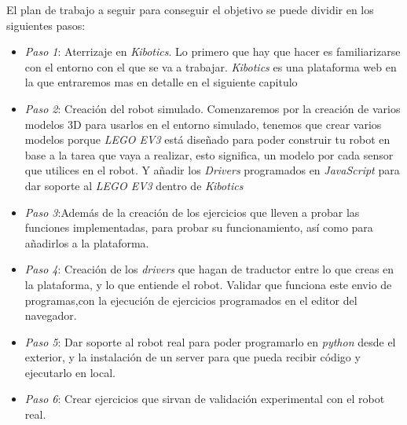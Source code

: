 El plan de trabajo a seguir para conseguir el objetivo se puede dividir en los siguientes pasos:
\begin{itemize}
    \item \textit{Paso 1}: Aterrizaje en \textit{Kibotics}. Lo primero que hay que hacer es familiarizarse con el entorno con el que se va a trabajar. \textit{Kibotics} es una plataforma web en la que entraremos mas en detalle en el siguiente capitulo 
    \item \textit{Paso 2}: Creación del robot simulado. Comenzaremos por la creación de varios modelos 3D para usarlos en el entorno simulado, tenemos que crear varios modelos porque \textit{LEGO EV3} está diseñado para poder construir tu robot en base a la tarea que vaya a realizar, esto significa, un modelo por cada sensor que utilices en el robot. Y añadir los \textit{Drivers} programados en \textit{JavaScript} para dar soporte al \textit{LEGO EV3} dentro de \textit{Kibotics}
     \item \textit{Paso 3}:Además de la creación de los ejercicios que lleven a probar las funciones implementadas, para probar su funcionamiento, así como para añadirlos a la plataforma.
    \item \textit{Paso 4}: Creación de los \textit{drivers} que hagan de traductor entre lo que creas en la plataforma, y lo que entiende el robot. Validar que funciona este envio de programas,con la ejecución de ejercicios programados en el editor del navegador.
    \item \textit{Paso 5}: Dar soporte al robot real para poder programarlo en \textit{python} desde el exterior, y la instalación de un server para que pueda recibir código y ejecutarlo en local.\newline
    \item \textit{Paso 6}: Crear ejercicios que sirvan de validación experimental con el robot real.
    
\end{itemize}